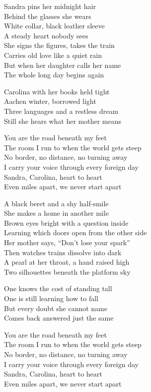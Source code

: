 \begin{lyrics}
Sandra pins her midnight hair\\
Behind the glasses she wears\\
White collar, black leather sleeve\\
A steady heart nobody sees\\
She signs the figures, takes the train\\
Carries old love like a quiet rain\\
But when her daughter calls her name\\
The whole long day begins again

Carolina with her books held tight\\
Aachen winter, borrowed light\\
Three languages and a restless dream\\
Still she hears what her mother means

You are the road beneath my feet\\
The room I run to when the world gets steep\\
No border, no distance, no turning away\\
I carry your voice through every foreign day\\
Sandra, Carolina, heart to heart\\
Even miles apart, we never start apart

A black beret and a shy half-smile\\
She makes a home in another mile\\
Brown eyes bright with a question inside\\
Learning which doors open from the other side\\
Her mother says, “Don’t lose your spark”\\
Then watches trains dissolve into dark\\
A pearl at her throat, a hand raised high\\
Two silhouettes beneath the platform sky

One knows the cost of standing tall\\
One is still learning how to fall\\
But every doubt she cannot name\\
Comes back answered just the same

You are the road beneath my feet\\
The room I run to when the world gets steep\\
No border, no distance, no turning away\\
I carry your voice through every foreign day\\
Sandra, Carolina, heart to heart\\
Even miles apart, we never start apart


\end{lyrics}
